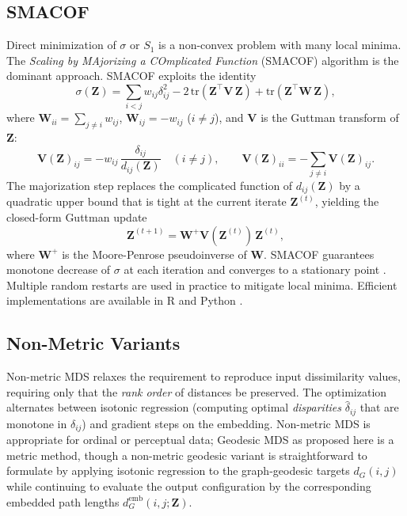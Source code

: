 \documentclass[twoside,11pt]{article}
\newcommand{\bZ}{\mathbf{Z}}
\newcommand{\bV}{\mathbf{V}}
\newcommand{\bW}{\mathbf{W}}
\newcommand{\demb}{d^{\mathrm{emb}}}
\newcommand{\StressOne}{S_1}
\begin{document}
\subsection{SMACOF}
\label{sec:smacof}

Direct minimization of $\sigma$ or $\StressOne$ is a non-convex problem
with many local minima.  The \emph{Scaling by MAjorizing a COmplicated
Function} (SMACOF) algorithm \citep{deleeuw1977applications,
deleeuw2009multidimensional} is the dominant approach.  SMACOF exploits
the identity
\begin{equation}
  \sigma(\bZ) = \sum_{i<j}w_{ij}\delta_{ij}^2
               - 2\,\mathrm{tr}(\bZ^\top \bV\,\bZ)
               + \mathrm{tr}(\bZ^\top \bW\,\bZ),
  \label{eq:smacof_decomp}
\end{equation}
where $\bW_{ii} = \sum_{j \neq i} w_{ij}$, $\bW_{ij} = -w_{ij}$ ($i \neq
j$), and $\bV$ is the Guttman transform of $\bZ$:
\begin{equation}
  \bV(\bZ)_{ij} = -w_{ij}\,\frac{\delta_{ij}}{d_{ij}(\bZ)}\quad(i \neq j),
  \qquad
  \bV(\bZ)_{ii} = -\sum_{j \neq i} \bV(\bZ)_{ij}.
  \label{eq:guttman}
\end{equation}
The majorization step replaces the complicated function of $d_{ij}(\bZ)$
by a quadratic upper bound that is tight at the current iterate $\bZ^{(t)}$,
yielding the closed-form Guttman update
\begin{equation}
  \bZ^{(t+1)} = \bW^+ \bV(\bZ^{(t)})\,\bZ^{(t)},
  \label{eq:guttman_update}
\end{equation}
where $\bW^+$ is the Moore-Penrose pseudoinverse of $\bW$.  SMACOF
guarantees monotone decrease of $\sigma$ at each iteration and converges
to a stationary point \citep{deleeuw2009multidimensional}.  Multiple random
restarts are used in practice to mitigate local minima.  Efficient
implementations are available in R \citep{deleeuw2009multidimensional}
and Python \citep{pedregosa2011scikit}.

\subsection{Non-Metric Variants}
\label{sec:nonmetric_mds}

Non-metric MDS \citep{kruskal1964nonmetric, shepard1962analysis} relaxes
the requirement to reproduce input dissimilarity values, requiring only
that the \emph{rank order} of distances be preserved.  The optimization
alternates between isotonic regression (computing optimal
\emph{disparities} $\hat\delta_{ij}$ that are monotone in $\delta_{ij}$)
and gradient steps on the embedding.  Non-metric MDS is appropriate for
ordinal or perceptual data; Geodesic MDS as proposed here is a metric
method, though a non-metric geodesic variant is straightforward to
formulate by applying isotonic regression to the graph-geodesic targets
$d_G(i,j)$ while continuing to evaluate the output configuration by the
corresponding embedded path lengths $\demb_G(i,j;\bZ)$.
\end{document}
